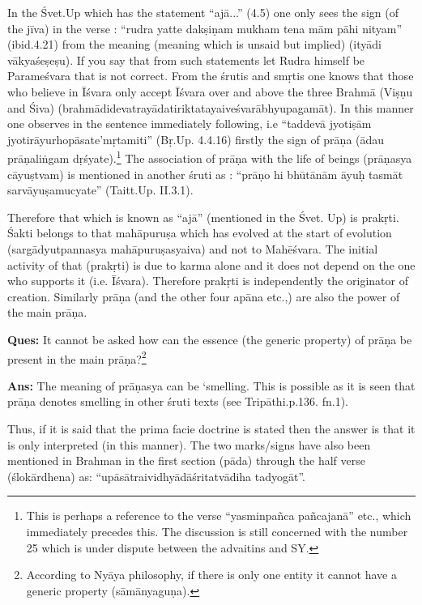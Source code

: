 In the Śvet.Up which has the statement “ajā...” (4.5) one only sees the sign (of the jīva) in the verse : “rudra yatte dakṣiṇam mukham tena mām pāhi nityam” (ibid.4.21) from the meaning (meaning which is unsaid but implied) (ityādi vākyaśeṣeṣu). If you say that from such statements let Rudra himself be Parameśvara that is not correct. From the śrutis and smṛtis one knows that those who believe in Īśvara only accept Īśvara over and above the three Brahmā (Viṣṇu and Śiva) (brahmādidevatrayādatiriktatayaiveśvarābhyupagamāt). In this manner one observes in the sentence immediately following, i.e “taddevā jyotiṣām jyotirāyurhopāsate’mṛtamiti” (Bṛ.Up. 4.4.16) firstly the sign of prāṇa (ādau prāṇaliṅgam dṛśyate).\footnote{This is perhaps a reference to the verse “yasminpañca pañcajanā” etc., which immediately precedes this. The discussion is still concerned with the number 25 which is under dispute between the  advaitins and SY.} The association of prāṇa with the life of beings (prāṇasya cāyuṣtvam) is mentioned in another śruti as : “prāṇo hi bhūtānām āyuḥ tasmāt sarvāyuṣamucyate” (Taitt.Up. II.3.1).
 
Therefore that which is known as “ajā” (mentioned in the Śvet. Up) is prakṛti. Śakti belongs to that mahāpuruṣa which has evolved at the start of evolution (sargādyutpannasya mahāpuruṣasyaiva) and not to Mahēśvara. The initial activity of that (prakṛti) is due to karma alone and it does not depend on the one who supports it (i.e. Īśvara). Therefore prakṛti is independently the originator of creation. Similarly prāṇa (and the other four apāna etc.,) are also the power of the main prāṇa.

\textbf{Ques:} It cannot be asked how can the essence (the generic property) of prāṇa be present in the main prāṇa?\footnote{According to Nyāya philosophy, if there is only one entity it cannot have a generic property (sāmānyaguṇa).}

\textbf{Ans:} The meaning of prāṇasya can be ‘smelling. This is possible as it is seen that prāṇa denotes smelling in other śruti texts (see Tripāthi.p.136. fn.1).

Thus, if it is said that the prima facie doctrine is stated then the answer is that it is only interpreted (in this manner). The two marks/signs have also been mentioned in Brahman in the first section (pāda) through the half verse (ślokārdhena) as: “upāsātraividhyādāśritatvādiha tadyogāt”.

